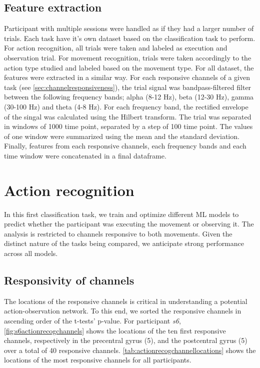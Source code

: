 \documentclass[10pt,conference,compsocconf]{IEEEtran}
\begin{document}
\subsection{Feature extraction}
Participant with multiple sessions were handled as if they had a larger number of trials. Each task have it's own dataset based on the classification task to perform. For action recognition, all trials were taken and labeled as execution and observation trial. For movement recognition, trials were taken accordingly to the action type studied and labeled based on the movement type. For all dataset, the features were extracted in a similar way. For each responsive channels of a given task (see \ref{sec:channelresponsiveness}), the trial signal was bandpass-filtered filter between the following frequency bands; alpha (8-12 Hz), beta (12-30 Hz), gamma (30-100 Hz) and theta (4-8 Hz). For each frequency band, the rectified envelope of the singal was calculated using the Hilbert transform. The trial was separated in windows of 1000 time point, separated by a step of 100 time point. The values of one window were summarized using the mean and the standard deviation. Finally, features from each responsive channels, each frequency bands and each time window were concatenated in a final dataframe.

\section{Action recognition}
\label{sec:actionrecognition}
In this first classification task, we train and optimize different ML models to predict whether the participant was executing the movement or observing it. The analysis is restricted to channels responsive to both movements. Given the distinct nature of the tasks being compared, we anticipate strong performance across all models.

\subsection{Responsivity of channels}
The locations of the responsive channels is critical in understanding a potential action-observation network. To this end, we sorted the responsive channels in ascending order of the t-tests' p-value. For participant \textit{s6}, \autoref{fig:s6actionrecogchannels} shows the locations of the ten first responsive channels, respectively in the precentral gyrus (5), and the postcentral gyrus (5) over a total of 40 responsive channels. \autoref{tab:actionrecogchannellocations} shows the locations of the most responsive channels for all participants.
\end{document}

